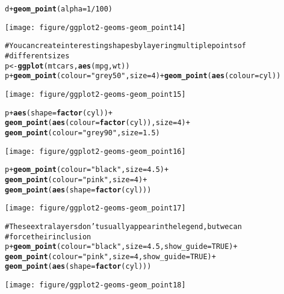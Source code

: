 \documentclass[a4paper,titlepage]{tufte-handout}\usepackage{graphicx, color}
\makeatletter
\def\maxwidth{ %
  \ifdim\Gin@nat@width>\linewidth
    \linewidth
  \else
    \Gin@nat@width
  \fi
}
\newcommand{\hlfunctioncall}[1]{\textcolor[rgb]{0.501960784313725,0,0.329411764705882}{\textbf{#1}}}%
\newcommand{\hlstring}[1]{\textcolor[rgb]{0.6,0.6,1}{#1}}%
\newcommand{\hlcomment}[1]{\textcolor[rgb]{0.180392156862745,0.6,0.341176470588235}{#1}}%
\newenvironment{kframe}{%
 \def\at@end@of@kframe{}%
 \ifinner\ifhmode%
  \def\at@end@of@kframe{\end{minipage}}%
  \begin{minipage}{\columnwidth}%
 \fi\fi%
 \def\FrameCommand##1{\hskip\@totalleftmargin \hskip-\fboxsep
 \colorbox{shadecolor}{##1}\hskip-\fboxsep
     \hskip-\linewidth \hskip-\@totalleftmargin \hskip\columnwidth}%
 \MakeFramed {\advance\hsize-\width
   \@totalleftmargin\z@ \linewidth\hsize
   \@setminipage}}%
 {\par\unskip\endMakeFramed%
 \at@end@of@kframe}
\newenvironment{knitrout}{}{} %
\makeatother
\begin{document}
\begin{knitrout}
\begin{kframe}
\begin{alltt}
d + \hlfunctioncall{geom_point}(alpha = 1/100)
\end{alltt}
\end{kframe}\texttt{[image: figure/ggplot2-geoms-geom\_point14]} \begin{kframe}\begin{alltt}
\hlcomment{# You can create interesting shapes by layering multiple points of}
\hlcomment{# different sizes}
p <- \hlfunctioncall{ggplot}(mtcars, \hlfunctioncall{aes}(mpg, wt))
p + \hlfunctioncall{geom_point}(colour=\hlstring{"grey50"}, size = 4) + \hlfunctioncall{geom_point}(\hlfunctioncall{aes}(colour = cyl))
\end{alltt}
\end{kframe}\texttt{[image: figure/ggplot2-geoms-geom\_point15]} \begin{kframe}\begin{alltt}
p + \hlfunctioncall{aes}(shape = \hlfunctioncall{factor}(cyl)) +
  \hlfunctioncall{geom_point}(\hlfunctioncall{aes}(colour = \hlfunctioncall{factor}(cyl)), size = 4) +
  \hlfunctioncall{geom_point}(colour=\hlstring{"grey90"}, size = 1.5)
\end{alltt}
\end{kframe}\texttt{[image: figure/ggplot2-geoms-geom\_point16]} \begin{kframe}\begin{alltt}
p + \hlfunctioncall{geom_point}(colour=\hlstring{"black"}, size = 4.5) +
  \hlfunctioncall{geom_point}(colour=\hlstring{"pink"}, size = 4) +
  \hlfunctioncall{geom_point}(\hlfunctioncall{aes}(shape = \hlfunctioncall{factor}(cyl)))
\end{alltt}
\end{kframe}\texttt{[image: figure/ggplot2-geoms-geom\_point17]} \begin{kframe}\begin{alltt}
\hlcomment{# These extra layers don't usually appear in the legend, but we can}
\hlcomment{# force their inclusion}
p + \hlfunctioncall{geom_point}(colour=\hlstring{"black"}, size = 4.5, show_guide = TRUE) +
  \hlfunctioncall{geom_point}(colour=\hlstring{"pink"}, size = 4, show_guide = TRUE) +
  \hlfunctioncall{geom_point}(\hlfunctioncall{aes}(shape = \hlfunctioncall{factor}(cyl)))
\end{alltt}
\end{kframe}\texttt{[image: figure/ggplot2-geoms-geom\_point18]} \begin{kframe}\begin{alltt}

\end{alltt}
\end{kframe}
\end{knitrout}
\end{document}
